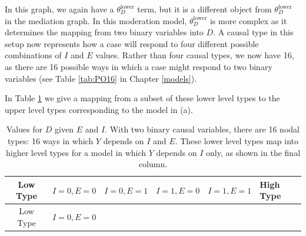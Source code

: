 \documentclass[12pt,]{book}
\begin{document}
In this graph, we again have a \(\theta_D^{\text{lower}}\) term, but it is a different object from \(\theta_D^{\text{lower}}\) in the mediation graph. In this moderation model, \(\theta_D^{\text{lower}}\) is more complex as it determines the mapping from two binary variables into \(D\). A causal type in this setup now represents how a case will respond to four different possible combinations of \(I\) and \(E\) values. Rather than four causal types, we now have 16, as there are 16 possible ways in which a case might respond to two binary variables (see Table \ref{tab:PO16} in Chapter \ref{models}).

In Table \ref{tab:PO16b} we give a mapping from a subset of these lower level types to the upper level types corresponding to the model in (a).

\begin{longtable}[]{@{}cccccl@{}}
\caption{\label{tab:PO16b} Values for \(D\) given \(E\) and \(I\). With two binary causal variables, there are 16 nodal types: 16 ways in which \(Y\) depends on \(I\) and \(E\). These lower level types map into higher level types for a model in which \(Y\) depends on \(I\) only, as shown in the final column.}\tabularnewline
\toprule
\begin{minipage}[b]{0.17\columnwidth}\centering
Low Type\strut
\end{minipage} & \begin{minipage}[b]{0.09\columnwidth}\centering
\(I=0,E=0\)\strut
\end{minipage} & \begin{minipage}[b]{0.09\columnwidth}\centering
\(I=0,E=1\)\strut
\end{minipage} & \begin{minipage}[b]{0.09\columnwidth}\centering
\(I=1,E=0\)\strut
\end{minipage} & \begin{minipage}[b]{0.09\columnwidth}\centering
\(I=1, E=1\)\strut
\end{minipage} & \begin{minipage}[b]{0.30\columnwidth}\raggedright
High Type\strut
\end{minipage}\tabularnewline
\midrule
\endfirsthead
\toprule
\begin{minipage}[b]{0.17\columnwidth}\centering
Low Type\strut
\end{minipage} & \begin{minipage}[b]{0.09\columnwidth}\centering
\(I=0,E=0\)\strut
\end{minipage} & \begin{minipage}[b]{0.09\columnwidth}\centering

\end{minipage}
\end{longtable}
\end{document}
